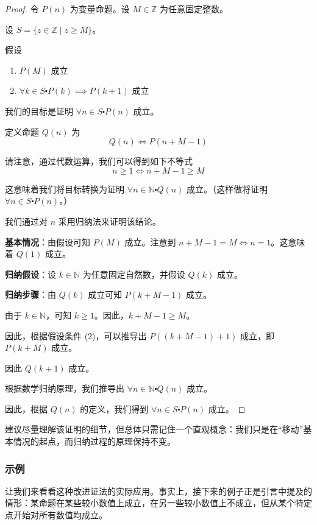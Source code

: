 \begin{proof}
    令 $P(n)$ 为变量命题。设 $M \in \mathbb{Z}$ 为任意固定整数。

    设 $S = \{z \in \mathbb{Z} \mid z \ge M\}$。

    假设
    \begin{enumerate}[label=(\arabic*)]
        \item $P(M)$ 成立
        \item $\forall k \in S \centerdot P(k) \implies P(k + 1)$ 成立
    \end{enumerate}

    我们的目标是证明 $\forall n \in S \centerdot P(n)$ 成立。

    定义命题 $Q(n)$ 为
    \[Q(n) \iff P(n+M-1)\]

    请注意，通过代数运算，我们可以得到如下不等式
    \[n \ge 1 \iff n+M-1 \ge M\]
    
    这意味着我们将目标转换为证明 $\forall n \in \mathbb{N} \centerdot Q(n)$ 成立。（这样做将证明 $\forall n \in S \centerdot P(n)$。）
    
    我们通过对 $n$ 采用归纳法来证明该结论。

    \textbf{基本情况}：由假设可知 $P(M)$ 成立。注意到 $n + M - 1 = M \iff n = 1$。这意味着 $Q(1)$ 成立。

    \textbf{归纳假设}：设 $k \in \mathbb{N}$ 为任意固定自然数，并假设 $Q(k)$ 成立。

    \textbf{归纳步骤}：由 $Q(k)$ 成立可知 $P(k + M - 1)$ 成立。

    由于 $k \in \mathbb{N}$，可知 $k \ge 1$。因此，$k + M - 1 \ge M$。

    因此，根据假设条件 (2)，可以推导出 $P((k+M-1)+1)$ 成立，即 $P(k + M)$ 成立。

    因此 $Q(k + 1)$ 成立。

    根据数学归纳原理，我们推导出 $\forall n \in \mathbb{N} \centerdot Q(n)$ 成立。

    因此，根据 $Q(n)$ 的定义，我们得到 $\forall n \in S \centerdot P(n)$ 成立。
\end{proof}

建议尽量理解该证明的细节，但总体只需记住一个直观概念：我们只是在``移动''基本情况的起点，而归纳过程的原理保持不变。

\subsubsection*{示例}

让我们来看看这种改进证法的实际应用。事实上，接下来的例子正是引言中提及的情形：某命题在某些较小数值上成立，在另一些较小数值上不成立，但从某个特定点开始对所有数值均成立。\\

